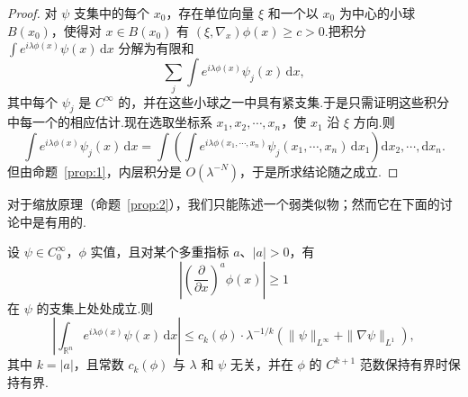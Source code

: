 \documentclass[
  BookTitleCN={傅里叶分析中的振动积分},
  BookTitleEN={Oscillatory Integrals in Fourier Analysis},
  OriginalAuthor={E.~M. Stein},
  OriginalEdition={Proc. Sympos. Pure Math. 35, Part~1},
  OriginalPublisher={American Mathematical Society},
  OriginalYear={1979},
  Translator={翻译及重排},
  ModelUsed={Codex CLI},
  Biblatex=false,
  TranslationDate={2026年8月27日}
]{mathtranslation}
\numberwithin{equation}{chapter}   %
\newcommand{\R}{\mathbb{R}}
\begin{document}
\begin{proof}
  对 $\psi$ 支集中的每个 $x_0$，存在单位向量 $\xi$ 和一个以 $x_0$ 为中心的小球 $B(x_0)$，使得对 $x\in B(x_0)$ 有 $(\xi,\nabla_x)\phi(x)\geq c>0$.把积分 $\int e^{i\lambda\phi(x)}\psi(x)\,\mathrm{d}x$ 分解为有限和
  \[
    \sum_{j}\int e^{i\lambda\phi(x)}\psi_{j}(x)\,\mathrm{d}x,
  \]
  其中每个 $\psi_{j}$ 是 $C^\infty$ 的，并在这些小球之一中具有紧支集.于是只需证明这些积分中每一个的相应估计.现在选取坐标系 $x_1,x_2,\cdots,x_n$，使 $x_1$ 沿 $\xi$ 方向.则
  \[
    \int e^{i\lambda\phi(x)}\psi_{j}(x)\,\mathrm{d}x = \int\left(\int e^{i\lambda\phi(x_1,\cdots,x_n)}\psi_{j}(x_1,\cdots,x_n)\,\mathrm{d}x_1\right)\mathrm{d}x_2,\cdots,\mathrm{d}x_n .
  \]
  但由命题~\ref{prop:1}，内层积分是 $O(\lambda^{-N})$，于是所求结论随之成立.
\end{proof}

\noindent 对于缩放原理（命题~\ref{prop:2}），我们只能陈述一个弱类似物；然而它在下面的讨论中是有用的.

\begin{proposition}\label{prop:5}
  设 $\psi\in C_0^\infty$，$\phi$ 实值，且对某个多重指标 $a$、$|a|>0$，有
  \[
    \left|\left(\frac{\partial}{\partial x}\right)^{a}\phi(x)\right|\geq1
  \]
  在 $\psi$ 的支集上处处成立.则
  \begin{equation}
    \left|\int_{\R^n}e^{i\lambda\phi(x)}\psi(x)\,\mathrm{d}x\right|\leq c_{k}(\phi)\cdot\lambda^{-1/k}\left(\|\psi\|_{L^\infty}+\|\nabla\psi\|_{L^{1}}\right), \label{eq:2.1}
  \end{equation}
  其中 $k=|a|$，且常数 $c_{k}(\phi)$ 与 $\lambda$ 和 $\psi$ 无关，并在 $\phi$ 的 $C^{k+1}$ 范数保持有界时保持有界.
\end{proposition}
\end{document}
